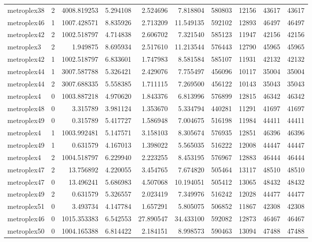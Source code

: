 \begin{longtable}{|l|r|r|r|r|r|r|r|r|r|}
metroplex38 & 2 & 4008.819253 & 5.294108 & 2.524696 & 7.818804 & 580803 & 12156 & 43617 & 43617 \\
metroplex46 & 1 & 1007.428571 & 8.835926 & 2.713209 & 11.549135 & 592102 & 12893 & 46497 & 46497 \\
metroplex42 & 2 & 1002.518797 & 4.714838 & 2.606702 & 7.321540 & 585123 & 11947 & 42156 & 42156 \\
metroplex3 & 2 & 1.949875 & 8.695934 & 2.517610 & 11.213544 & 576443 & 12790 & 45965 & 45965 \\
metroplex42 & 1 & 1002.518797 & 6.833601 & 1.747983 & 8.581584 & 585107 & 11931 & 42132 & 42132 \\
metroplex44 & 1 & 3007.587788 & 5.326421 & 2.429076 & 7.755497 & 456096 & 10117 & 35004 & 35004 \\
metroplex44 & 2 & 3007.688335 & 5.558385 & 1.711115 & 7.269500 & 456122 & 10143 & 35043 & 35043 \\
metroplex4 & 0 & 1003.887218 & 4.970620 & 1.843376 & 6.813996 & 576899 & 12815 & 46342 & 46342 \\
metroplex48 & 0 & 3.315789 & 3.981124 & 1.353670 & 5.334794 & 440281 & 11291 & 41697 & 41697 \\
metroplex49 & 0 & 0.315789 & 5.417727 & 1.586948 & 7.004675 & 516198 & 11984 & 44411 & 44411 \\
metroplex4 & 1 & 1003.992481 & 5.147571 & 3.158103 & 8.305674 & 576935 & 12851 & 46396 & 46396 \\
metroplex49 & 1 & 0.631579 & 4.167013 & 1.398022 & 5.565035 & 516222 & 12008 & 44447 & 44447 \\
metroplex4 & 2 & 1004.518797 & 6.229940 & 2.223255 & 8.453195 & 576967 & 12883 & 46444 & 46444 \\
metroplex47 & 2 & 13.756892 & 4.220055 & 3.454765 & 7.674820 & 505464 & 13117 & 48510 & 48510 \\
metroplex47 & 0 & 13.496241 & 5.686983 & 4.507068 & 10.194051 & 505412 & 13065 & 48432 & 48432 \\
metroplex49 & 2 & 0.631579 & 5.326557 & 2.023419 & 7.349976 & 516242 & 12028 & 44477 & 44477 \\
metroplex51 & 0 & 3.493734 & 4.147784 & 1.657291 & 5.805075 & 506852 & 11867 & 42308 & 42308 \\
metroplex46 & 0 & 1015.353383 & 6.542553 & 27.890547 & 34.433100 & 592082 & 12873 & 46467 & 46467 \\
metroplex50 & 0 & 1004.165388 & 6.814422 & 2.184151 & 8.998573 & 590463 & 13094 & 47488 & 47488 \\

\end{longtable}
